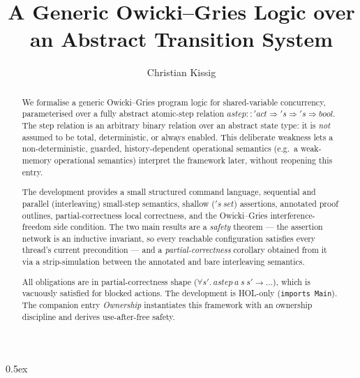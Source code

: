 \documentclass[11pt,a4paper]{article}
\begin{document}
\title{A Generic Owicki--Gries Logic over an Abstract Transition System}
\author{Christian Kissig}
\maketitle

\begin{abstract}
  We formalise a generic Owicki--Gries program logic for shared-variable
  concurrency, parameterised over a fully abstract atomic-step relation
  $\mathit{astep} :: \mathit{'act} \Rightarrow \mathit{'s} \Rightarrow
  \mathit{'s} \Rightarrow \mathit{bool}$.  The step relation is an arbitrary
  binary relation over an abstract state type: it is \emph{not} assumed to be
  total, deterministic, or always enabled.  This deliberate weakness lets a
  non-deterministic, guarded, history-dependent operational semantics
  (e.g.\ a weak-memory operational semantics) interpret the framework later,
  without reopening this entry.

  The development provides a small structured command language, sequential and
  parallel (interleaving) small-step semantics, shallow ($\mathit{'s\ set}$)
  assertions, annotated proof outlines, partial-correctness local correctness,
  and the Owicki--Gries interference-freedom side condition.  The two main
  results are a \emph{safety} theorem --- the assertion network is an inductive
  invariant, so every reachable configuration satisfies every thread's current
  precondition --- and a \emph{partial-correctness} corollary obtained from it
  via a strip-simulation between the annotated and bare interleaving semantics.

  All obligations are in partial-correctness shape
  ($\forall s'.\ \mathit{astep}\ a\ s\ s' \longrightarrow \ldots$), which is
  vacuously satisfied for blocked actions.  The development is HOL-only
  (\texttt{imports Main}).  The companion entry \emph{Ownership} instantiates
  this framework with an ownership discipline and derives use-after-free safety.
\end{abstract}

\tableofcontents

\parindent 0pt\parskip 0.5ex


\end{document}
